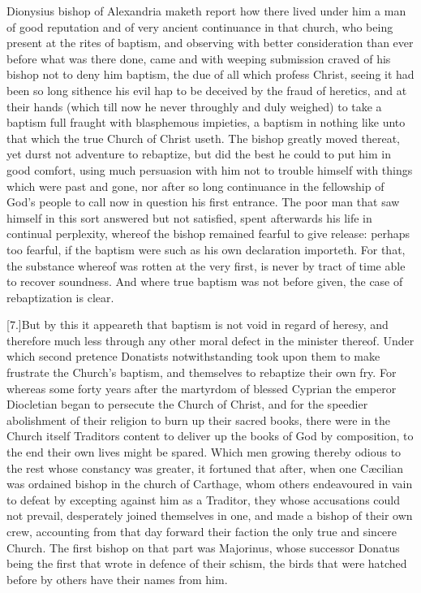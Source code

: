 Dionysius bishop of Alexandria maketh report how there lived under him a man of good reputation and of very ancient continuance in that church, who being present at the rites of baptism, and observing with better consideration than ever before what was there done, came and with weeping submission craved of his bishop not to deny him baptism, the  due of all which profess Christ,
 seeing it had been so long sithence his evil hap to be deceived by the fraud of heretics, and at their hands (which till now he never throughly and duly weighed) to take a baptism full fraught with blasphemous impieties, a baptism in nothing like unto that which the true Church of Christ useth. The bishop greatly moved thereat, yet durst not adventure to rebaptize, but did the best he could to put him in good comfort, using much persuasion with him not to trouble himself with things which were past and gone, nor after so long continuance in the fellowship of God’s people to call now in question his first entrance. The poor man that saw himself in this sort answered but not satisfied, spent afterwards his life in continual perplexity, whereof the bishop remained fearful to give release: perhaps too fearful, if the baptism were such as his own declaration importeth. For that, the substance whereof was rotten at the very first, is never by tract of time able to recover soundness. And where true baptism was not before given, the case of rebaptization is clear.

[7.]But by this it appeareth that baptism is not void in regard of heresy, and therefore much less through any other moral defect in the minister thereof. Under which second pretence Donatists notwithstanding took upon them to make frustrate the Church’s baptism, and themselves to rebaptize their own fry. For whereas some forty years after the martyrdom of blessed Cyprian the emperor Diocletian began to persecute the Church of Christ, and for the speedier abolishment of their religion to burn up their sacred books, there were in the Church itself Traditors content to deliver up the books of God by composition, to the end their own lives might be spared. Which men growing thereby odious to the rest whose constancy was greater, it fortuned that after, when one Cæcilian was ordained bishop in the church of Carthage, whom others endeavoured in vain to defeat by excepting against him as a Traditor, they whose accusations could not prevail, desperately joined themselves in one, and made a bishop of their own crew, accounting from that day forward their faction the only true and sincere Church. The  first bishop on that part was Majorinus, whose successor Donatus being the first that wrote in defence of their schism, the birds that were hatched before by others have their names from him.

